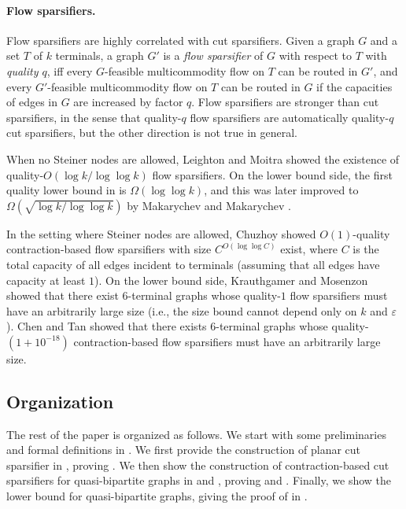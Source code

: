 \documentclass[11pt]{article}
\theoremstyle{definition}
\newcommand{\eps}{{\varepsilon}}
\begin{document}
\paragraph{Flow sparsifiers.}
Flow sparsifiers are highly correlated with cut sparsifiers.
Given a graph $G$ and a set $T$ of $k$ terminals, a graph $G'$ is a \emph{flow sparsifier} of $G$ with respect to $T$ with \emph{quality $q$}, iff every $G$-feasible multicommodity flow on $T$ can be routed in $G'$, and every $G'$-feasible multicommodity flow on $T$ can be routed in $G$ if the capacities of edges in $G$ are increased by factor $q$. Flow sparsifiers are stronger than cut sparsifiers, in the sense that quality-$q$ flow sparsifiers are automatically quality-$q$ cut sparsifiers, but the other direction is not true in general.

When no Steiner nodes are allowed,
Leighton and Moitra \cite{leighton2010extensions} showed the existence of quality-$O(\log k/\log\log k)$ flow sparsifiers. 
On the lower bound side, the first quality lower bound in \cite{leighton2010extensions} is $\Omega(\log\log k)$, and this was later improved to $\Omega(\sqrt{\log k/\log\log k})$ by Makarychev and Makarychev \cite{makarychev2010metric}.


In the setting where Steiner nodes are allowed,
Chuzhoy \cite{chuzhoy2012vertex} showed $O(1)$-quality contraction-based flow sparsifiers with size $C^{O(\log\log C)}$ exist, where $C$ is the total capacity of all edges incident to terminals (assuming that all edges have capacity at least $1$).
On the lower bound side, Krauthgamer and Mosenzon \cite{krauthgamer2023exact} showed that there exist $6$-terminal graphs whose quality-$1$ flow sparsifiers must have an arbitrarily large size (i.e., the size bound cannot depend only on $k$ and $\eps$). Chen and Tan \cite{chen20241+} showed that there exists $6$-terminal graphs whose quality-$(1+10^{-18})$ contraction-based flow sparsifiers must have an arbitrarily large size.


\subsection{Organization}
The rest of the paper is organized as follows. We start with some preliminaries and formal definitions in .
We first provide the construction of planar cut sparsifier in , proving . We then show the construction of contraction-based cut sparsifiers for quasi-bipartite graphs in  and , proving  and . Finally, we show the lower bound for quasi-bipartite graphs, giving the proof of  in .
\end{document}
